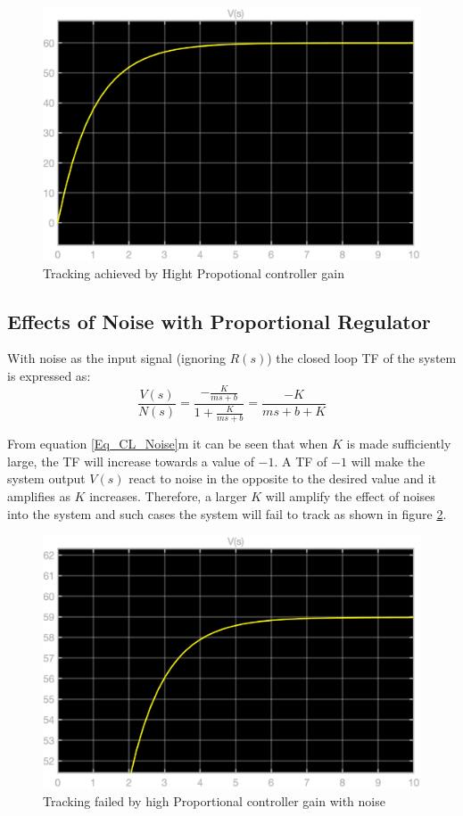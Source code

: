 \begin{figure}[h!]
	\centering
	\includegraphics[width=0.6\linewidth]{Bilder/P_Reg_Tracking.eps}
	\caption{Tracking achieved by Hight Propotional controller gain}
	\label{Fig_P_Regulator_Tracking}
\end{figure}

\subsection{Effects of Noise with Proportional Regulator} \label{Sec_NoiseInClosedloopArchitecture}

With noise as the input signal (ignoring $R(s)$) the closed loop TF of the system is expressed as:
\begin{equation} \label{Eq_CL_Noise}
	\frac{V(s)}{N(s)} = \frac{-\frac{K}{ms + b}}{1 + \frac{K}{ms + b}} = \frac{-K}{ms + b + K}
\end{equation}

From equation \ref{Eq_CL_Noise}m it can be seen that when $K$ is made sufficiently large, the TF will increase towards a value of $-1$. A TF of $-1$ will make the system output $V(s)$ react to noise in the opposite to the desired value and it amplifies as $K$ increases. Therefore, a larger $K$ will amplify the effect of noises into the system and such cases the system will fail to track as shown in figure \ref{Fig_P_Regulator_Tracking_Noise}.
\begin{figure}[h!]
	\centering
	\includegraphics[width=0.6\linewidth]{Bilder/P_Reg_with_Noise.eps}
	\caption{Tracking failed by high Proportional controller gain with noise}
	\label{Fig_P_Regulator_Tracking_Noise}
\end{figure}

